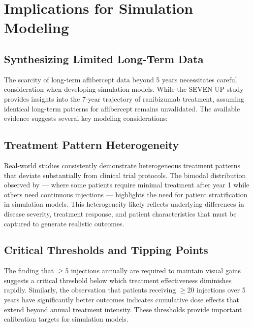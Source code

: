 
\section{Implications for Simulation Modeling}

\subsection{Synthesizing Limited Long-Term Data}

The scarcity of long-term aflibercept data beyond 5 years necessitates careful consideration when developing simulation models. While the SEVEN-UP study provides insights into the 7-year trajectory of ranibizumab treatment, assuming identical long-term patterns for aflibercept remains unvalidated. The available evidence suggests several key modeling considerations:

\subsection{Treatment Pattern Heterogeneity}

Real-world studies consistently demonstrate heterogeneous treatment patterns that deviate substantially from clinical trial protocols. The bimodal distribution observed by \citet{nishikawaFourYearOutcomeAflibercept2019} — where some patients require minimal treatment after year 1 while others need continuous injections — highlights the need for patient stratification in simulation models. This heterogeneity likely reflects underlying differences in disease severity, treatment response, and patient characteristics that must be captured to generate realistic outcomes.

\subsection{Critical Thresholds and Tipping Points}

The finding that $\geq$5 injections annually are required to maintain visual gains \citep{kimImpactInjectionFrequency2020} suggests a critical threshold below which treatment effectiveness diminishes rapidly. Similarly, the observation that patients receiving $\geq$20 injections over 5 years have significantly better outcomes indicates cumulative dose effects that extend beyond annual treatment intensity. These thresholds provide important calibration targets for simulation models.

